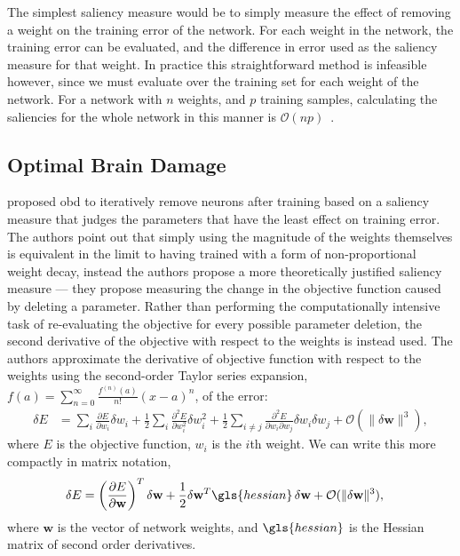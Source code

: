 \documentclass[thesis]{subfiles}
\begin{document}
	The simplest saliency measure would be to simply measure the effect of removing a weight on the training error of the network. For each weight in the network, the training error can be evaluated, and the difference in error used as the saliency measure for that weight. In practice this straightforward method is infeasible however, since we must evaluate over the training set for each weight of the network. For a network with $n$ weights, and $p$ training samples, calculating the saliencies for the whole network in this manner is $\mathcal{O}(np)$~\citep{hanson1989comparing}.
	
	\subsection{Optimal Brain Damage}
    \citet{lecun1989optimal} proposed \gls{obd} to iteratively remove neurons after training based on a saliency measure that judges the parameters that have the least effect on training error. The authors point out that simply using the magnitude of the weights themselves is equivalent in the limit to having trained with a form of non-proportional weight decay, instead the authors propose a more theoretically justified saliency measure --- they propose measuring the change in the objective function caused by deleting a parameter. Rather than performing the computationally intensive task of re-evaluating the objective for every possible parameter deletion, the second derivative of the objective with respect to the weights is instead used. The authors approximate the derivative of objective function with respect to the weights using the second-order Taylor series expansion, $f(a) = \sum_{n=0}^\infty \frac{f^{(n)}(a)}{n!} (x - a)^n$, of the error:
    \begin{align}
       \delta E &= \sum_i \frac{\partial E}{\partial w_i} \delta w_i + \frac{1}{2} \sum_i \frac{\partial^2 E}{\partial w_i^2} \delta w_i^2 + \frac{1}{2} \sum_{i\neq j} \frac{\partial^2 E}{\partial w_i \partial w_j} \delta w_i \delta w_j +\mathcal{O}(\|\delta \mathbf{w}\|^3),
    \end{align}
    where $E$ is the objective function, $w_i$ is the $i$th weight. We can write this more compactly in matrix notation,
    \begin{align}
       \delta E &= \left( \frac{\partial E}{\partial \mathbf{w}} \right)^T \delta \mathbf{w} +\frac{1}{2}\delta \mathbf{w}^T \gls{hessian}\, \delta \mathbf{w} +\mathcal{O}(\|\delta \mathbf{w}\|^3),
    \end{align}
	where $\mathbf{w}$ is the vector of network weights, and %
	$\gls{hessian}$ is the Hessian matrix of second order derivatives. 
\end{document}
